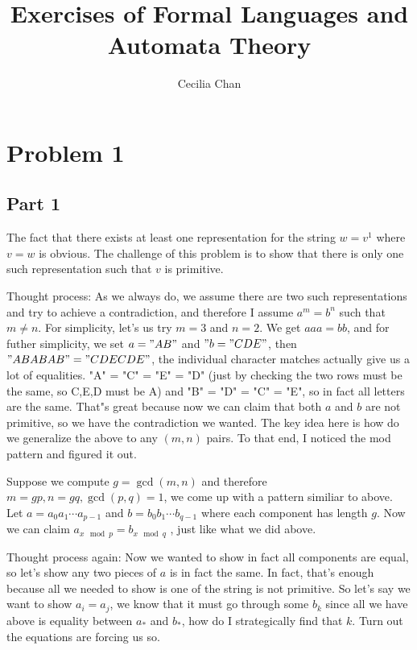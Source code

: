 \documentclass{article}
\title{Exercises of Formal Languages and Automata Theory}
\author{Cecilia Chan}
\begin{document}
\maketitle



\section*{Problem 1}
\subsection*{Part 1}
The fact that there exists at least one representation for the string $ w = v^1 $ where $ v = w $ is obvious. The challenge of this problem is to show that there is only one such representation such that $ v $ is primitive.

Thought process: As we always do, we assume there are two such representations and try to achieve a contradiction, and therefore I assume $ a^m = b^n $ such that $ m \ne n $. For simplicity, let's us try $ m = 3 $ and $ n = 2 $. We get $ aaa = bb $, and for futher simplicity, we set $ a = "AB" $ and $ "b = "CDE" $, then $ "ABABAB" = "CDECDE" $, the individual character matches actually give us a lot of equalities. "A" = "C" = "E" = "D"  (just by checking the two rows must be the same, so C,E,D must be A) and "B" = "D" = "C" = "E", so in fact all letters are the same. That"s great because now we can claim that both $ a $ and $ b $ are not primitive, so we have the contradiction we wanted. The key idea here is how do we generalize the above to any $ (m, n) $ pairs. To that end, I noticed the mod pattern and figured it out.

Suppose we compute $ g = \gcd(m, n) $ and therefore $ m = gp, n = gq, \gcd(p, q) = 1 $, we come up with a pattern similiar to above. Let $ a = a_0 a_1 \cdots a_{p-1} $ and $ b = b_0 b_1 \cdots b_{q-1} $ where each component has length $ g $. Now we can claim $ a_{x \mod p} = b_{x \mod q} $ , just like what we did above.

Thought process again: Now we wanted to show in fact all components are equal, so let's show any two pieces of $ a $ is in fact the same. In fact, that's enough because all we needed to show is one of the string is not primitive. So let's say we want to show $ a_i = a_j $, we know that it must go through some $ b_k $ since all we have above is equality between $ a_* $ and $ b_* $, how do I strategically find that $ k $. Turn out the equations are forcing us so.
\end{document}
